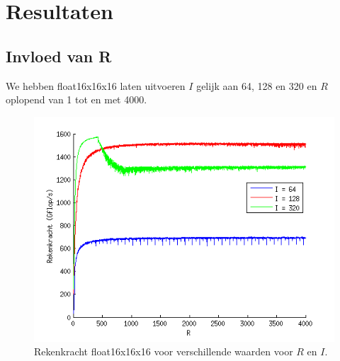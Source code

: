 \chapter{Resultaten}

\section{Invloed van R}
We hebben float16x16x16 laten uitvoeren $I$ gelijk aan 64, 128 en 320 en $R$ oplopend van 1 tot en met 4000.

\begin{figure}
\centering
\includegraphics{invlR}
\caption{\label{invlR}Rekenkracht float16x16x16 voor verschillende waarden voor $R$ en $I$.}
\end{figure}